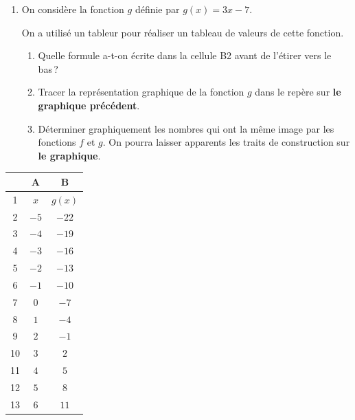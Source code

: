 \documentclass[a4paper,11pt]{article}
\begin{document}
\begin{minipage}[t]{10cm}
\begin{enumerate}[resume]
\item On considère la fonction $g$ définie par $g(x) = 3x - 7$.

On a utilisé un tableur pour réaliser un tableau de valeurs de cette fonction.
  \begin{enumerate}[label=\alph*., itemsep=3pt]
    \item Quelle formule a-t-on écrite dans la cellule B2 avant de l'étirer vers le bas\,?
    \item Tracer la représentation graphique de la fonction $g$ dans le repère sur \textbf{le graphique précédent}.
    \item Déterminer graphiquement les nombres qui ont la même image par les fonctions $f$ et $g$. On pourra laisser apparents les traits de construction sur \textbf{le graphique}.
  \end{enumerate}
\end{enumerate}
\end{minipage}\hfill
\begin{minipage}[t]{4.5cm}
\vspace{0pt}
\renewcommand{\arraystretch}{1.15}
\begin{center}
\begin{tabular}{|c|c|c|}
  \hline
     & A    & B       \\ \hline
  1  & $x$  & $g(x)$  \\ \hline
  2  & $-5$ & $-22$   \\ \hline
  3  & $-4$ & $-19$   \\ \hline
  4  & $-3$ & $-16$   \\ \hline
  5  & $-2$ & $-13$   \\ \hline
  6  & $-1$ & $-10$   \\ \hline
  7  & $0$  & $-7$    \\ \hline
  8  & $1$  & $-4$    \\ \hline
  9  & $2$  & $-1$    \\ \hline
  10 & $3$  & $2$     \\ \hline
  11 & $4$  & $5$     \\ \hline
  12 & $5$  & $8$     \\ \hline
  13 & $6$  & $11$    \\ \hline
\end{tabular}
\end{center}
\end{minipage}
\end{document}
